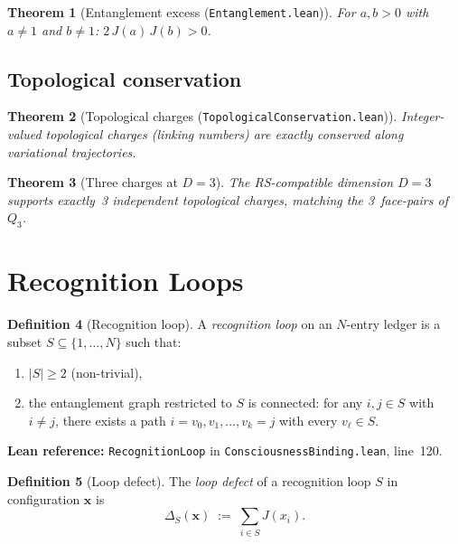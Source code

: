 \documentclass[11pt,a4paper]{article}
\theoremstyle{plain}
\newtheorem{theorem}{Theorem}[section]
\theoremstyle{definition}
\newtheorem{definition}[theorem]{Definition}
\theoremstyle{remark}
\newcommand{\Jcost}{J}
\begin{document}
\begin{theorem}[Entanglement excess {\normalfont(\texttt{Entanglement.lean})}]
\label{thm:excess}
For $a, b > 0$ with $a \neq 1$ and $b \neq 1$:
\;$2\,\Jcost(a)\,\Jcost(b) > 0$.
\end{theorem}

\subsection{Topological conservation}

\begin{theorem}[Topological charges {\normalfont(\texttt{TopologicalConservation.lean})}]
\label{thm:topo-conserved}
Integer-valued topological charges (linking numbers) are exactly
conserved along variational trajectories.
\end{theorem}

\begin{theorem}[Three charges at $D = 3$]
The RS-compatible dimension $D = 3$ supports exactly~3 independent
topological charges, matching the 3~face-pairs of $Q_3$.
\end{theorem}

\section{Recognition Loops}
\label{sec:loops}

\begin{definition}[Recognition loop]
\label{def:loop}
A \emph{recognition loop} on an $N$-entry ledger is a subset
$S \subseteq \{1, \ldots, N\}$ such that:
\begin{enumerate}[nosep,label=(\roman*)]
\item $|S| \geq 2$ \;(non-trivial),
\item the entanglement graph restricted to $S$ is connected: for any
  $i, j \in S$ with $i \neq j$, there exists a path
  $i = v_0, v_1, \ldots, v_k = j$ with every $v_\ell \in S$.
\end{enumerate}
\end{definition}

\noindent
\textbf{Lean reference:} \texttt{RecognitionLoop} in
\texttt{ConsciousnessBinding.lean}, line~120.

\begin{definition}[Loop defect]
\label{def:loop-defect}
The \emph{loop defect} of a recognition loop $S$ in configuration
$\mathbf{x}$ is
\[
  \Delta_S(\mathbf{x}) \;:=\; \sum_{i \in S} \Jcost(x_i).
\]
\end{definition}
\end{document}
